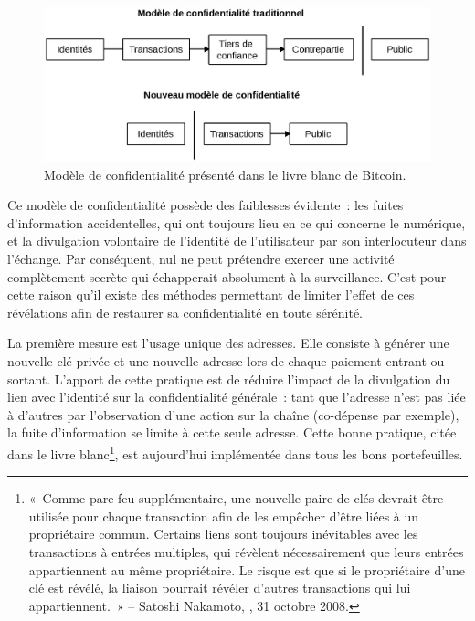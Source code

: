 \begin{figure}[h]
  \centering
  \includegraphics[scale=0.55]{img/white-paper-privacy-model-fr.eps}
  \caption{Modèle de confidentialité présenté dans le livre blanc de Bitcoin.}
\end{figure}

Ce modèle de confidentialité possède des faiblesses évidente~: les fuites d'information accidentelles, qui ont toujours lieu en ce qui concerne le numérique, et la divulgation volontaire de l'identité de l'utilisateur par son interlocuteur dans l'échange. Par conséquent, nul ne peut prétendre exercer une activité complètement secrète qui échapperait absolument à la surveillance. C'est pour cette raison qu'il existe des méthodes permettant de limiter l'effet de ces révélations afin de restaurer sa confidentialité en toute sérénité.

La première mesure est l'usage unique des adresses. Elle consiste à générer une nouvelle clé privée et une nouvelle adresse lors de chaque paiement entrant ou sortant. L'apport de cette pratique est de réduire l'impact de la divulgation du lien avec l'identité sur la confidentialité générale~: tant que l'adresse n'est pas liée à d'autres par l'observation d'une action sur la chaîne (co-dépense par exemple), la fuite d'information se limite à cette seule adresse. Cette bonne pratique, citée dans le livre blanc\footnote{«~Comme pare-feu supplémentaire, une nouvelle paire de clés devrait être utilisée pour chaque transaction afin de les empêcher d'être liées à un propriétaire commun. Certains liens sont toujours inévitables avec les transactions à entrées multiples, qui révèlent nécessairement que leurs entrées appartiennent au même propriétaire. Le risque est que si le propriétaire d'une clé est révélé, la liaison pourrait révéler d'autres transactions qui lui appartiennent.~» -- Satoshi Nakamoto, , 31 octobre 2008.}, est aujourd'hui implémentée dans tous les bons portefeuilles.

